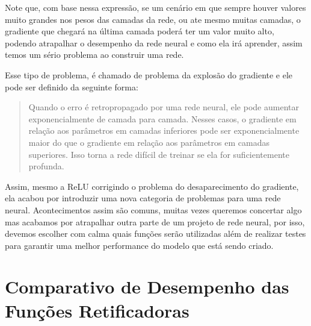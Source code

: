 Note que, com base nessa expressão, se um cenário em que sempre houver valores muito grandes nos pesos das camadas da rede, ou ate mesmo muitas camadas, o gradiente que chegará na última camada poderá ter um valor muito alto, podendo atrapalhar o desempenho da rede neural e como ela irá aprender, assim temos um sério problema ao construir uma rede.

Esse tipo de problema, é chamado de problema da explosão do gradiente e ele pode ser definido da seguinte forma:

\begin{quote}
    Quando o erro é retropropagado por uma rede neural, ele pode aumentar exponencialmente de camada para camada. Nesses casos, o gradiente em relação aos parâmetros em camadas inferiores pode ser exponencialmente maior do que o gradiente em relação aos parâmetros em
    camadas superiores. Isso torna a rede difícil de treinar se ela for suficientemente profunda.
\end{quote}

\parencite[p.~2]{explodingGradient}

Assim, mesmo a ReLU corrigindo o problema do desaparecimento do gradiente, ela acabou por introduzir uma nova categoria de problemas para uma rede neural. Acontecimentos assim são comuns, muitas vezes queremos concertar algo mas acabamos por atrapalhar outra parte de um projeto de rede neural, por isso, devemos escolher com calma quais funções serão utilizadas além de realizar testes para garantir uma melhor performance do modelo que está sendo criado.

\section{Comparativo de Desempenho das Funções Retificadoras}